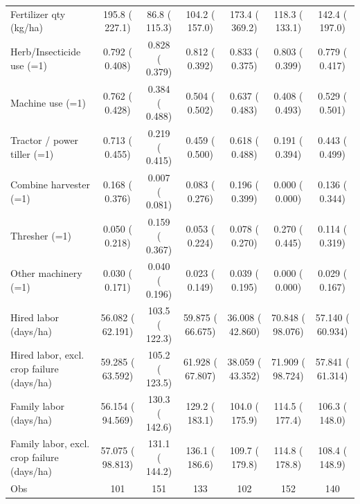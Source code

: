 \begin{tabular}{lcccccc}
Fertilizer qty (kg/ha) &        195.8 (       227.1) &         86.8 (       115.3) &        104.2 (       157.0) &        173.4 (       369.2) &        118.3 (       133.1) &        142.4 (       197.0) \\
Herb/Insecticide use (=1) &     0.792 (    0.408) &     0.828 (    0.379) &     0.812 (    0.392) &     0.833 (    0.375) &     0.803 (    0.399) &     0.779 (    0.417) \\
Machine use (=1) &     0.762 (    0.428) &     0.384 (    0.488)\sym{*} &     0.504 (    0.502) &     0.637 (    0.483) &     0.408 (    0.493) &     0.529 (    0.501) \\
\quad Tractor / power tiller (=1) &     0.713 (    0.455) &     0.219 (    0.415)\sym{*} &     0.459 (    0.500) &     0.618 (    0.488) &     0.191 (    0.394) &     0.443 (    0.499) \\
\quad Combine harvester (=1) &     0.168 (    0.376) &     0.007 (    0.081) &     0.083 (    0.276) &     0.196 (    0.399) &     0.000 (    0.000) &     0.136 (    0.344) \\
\quad Thresher (=1) &     0.050 (    0.218) &     0.159 (    0.367)\sym{*} &     0.053 (    0.224) &     0.078 (    0.270) &     0.270 (    0.445)\sym{**} &     0.114 (    0.319) \\
\quad Other machinery (=1) &     0.030 (    0.171) &     0.040 (    0.196) &     0.023 (    0.149) &     0.039 (    0.195) &     0.000 (    0.000) &     0.029 (    0.167) \\
Hired labor (days/ha) &    56.082 (   62.191) &        103.5 (       122.3)\sym{**} &    59.875 (   66.675) &    36.008 (   42.860) &    70.848 (   98.076)\sym{***} &    57.140 (   60.934)\sym{***} \\
\quad Hired labor, excl. crop failure (days/ha) &    59.285 (   63.592) &        105.2 (       123.5)\sym{*} &    61.928 (   67.807) &    38.059 (   43.352) &    71.909 (   98.724)\sym{***} &    57.841 (   61.314)\sym{***} \\
Family labor (days/ha) &    56.154 (   94.569) &        130.3 (       142.6)\sym{**} &        129.2 (       183.1)\sym{*} &        104.0 (       175.9) &        114.5 (       177.4) &        106.3 (       148.0) \\
\quad Family labor, excl. crop failure (days/ha) &    57.075 (   98.813) &        131.1 (       144.2)\sym{**} &        136.1 (       186.6)\sym{*} &        109.7 (       179.8) &        114.8 (       178.8) &        108.4 (       148.9) \\
\midrule
Obs &       101 &       151 &       133 &       102 &       152 &       140 \\
\bottomrule
\end{tabular}
